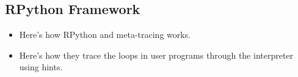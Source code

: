 \subsection{RPython Framework}
\label{subsec:rpython}

\begin{itemize}
\item Here's how RPython and meta-tracing works.

\item Here's how they trace the loops in user programs through the
interpreter using hints.  
\end{itemize}
